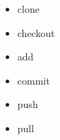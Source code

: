 \begin{frame}
    \begin{itemize}
        \item clone
        \item  checkout
        \item  add
        \item commit
        \item push
        \item pull
    \end{itemize}
\end{frame}


